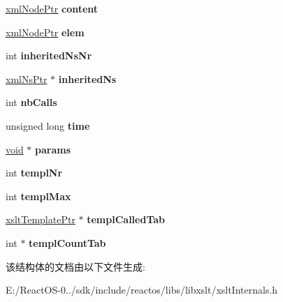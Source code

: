 \begin{DoxyCompactItemize}
\hyperlink{struct__xml_node}{xml\+Node\+Ptr} {\bfseries content}
\item 
\mbox{\label{struct__xslt_template_a0155b14fb912aba1b2957700827ffe11}} 
\hyperlink{struct__xml_node}{xml\+Node\+Ptr} {\bfseries elem}
\item 
\mbox{\label{struct__xslt_template_ac76e4217b8c888cb80baef565224c9ac}} 
int {\bfseries inherited\+Ns\+Nr}
\item 
\mbox{\label{struct__xslt_template_a88abe718409d2d6d4129fdbdf347ddac}} 
\hyperlink{struct__xml_ns}{xml\+Ns\+Ptr} $\ast$ {\bfseries inherited\+Ns}
\item 
\mbox{\label{struct__xslt_template_afccf42f04db46d809f353caec11cfe0b}} 
int {\bfseries nb\+Calls}
\item 
\mbox{\label{struct__xslt_template_aa763e93eefc7991ffaad333cdebd1c2a}} 
unsigned long {\bfseries time}
\item 
\mbox{\label{struct__xslt_template_a37477d9fa3b9f61b069adbfe0503a299}} 
\hyperlink{interfacevoid}{void} $\ast$ {\bfseries params}
\item 
\mbox{\label{struct__xslt_template_aa7ca6bea1c256cf08568913d1648fe14}} 
int {\bfseries templ\+Nr}
\item 
\mbox{\label{struct__xslt_template_ad450a2c0b8a62d530fb1cc96dcc796e3}} 
int {\bfseries templ\+Max}
\item 
\mbox{\label{struct__xslt_template_ad82a3e44658ad84f0d340f0f15b77c82}} 
\hyperlink{struct__xslt_template}{xslt\+Template\+Ptr} $\ast$ {\bfseries templ\+Called\+Tab}
\item 
\mbox{\label{struct__xslt_template_a4886846ce90557685bcb21874d587b07}} 
int $\ast$ {\bfseries templ\+Count\+Tab}
\end{DoxyCompactItemize}


该结构体的文档由以下文件生成\+:\begin{DoxyCompactItemize}
\item 
E\+:/\+React\+O\+S-\/0../sdk/include/reactos/libs/libxslt/xslt\+Internals.\+h\end{DoxyCompactItemize}
